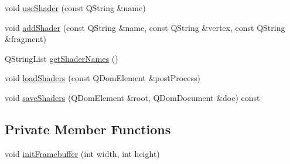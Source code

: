 \begin{DoxyCompactItemize}
void \hyperlink{class_my_open_g_l_widget_a87b9f933f545bf6f257820395771cc8b}{use\+Shader} (const Q\+String \&name)
\item 
void \hyperlink{class_my_open_g_l_widget_a1426e6f24592838e16c22a92870cf5f4}{add\+Shader} (const Q\+String \&name, const Q\+String \&vertex, const Q\+String \&fragment)
\item 
Q\+String\+List \hyperlink{class_my_open_g_l_widget_a99929e3c743d4f5793ef0e09ab61f2b2}{get\+Shader\+Names} ()
\item 
void \hyperlink{class_my_open_g_l_widget_af7899fd91898c1ed5dc228d7d6de658e}{load\+Shaders} (const Q\+Dom\+Element \&post\+Process)
\item 
void \hyperlink{class_my_open_g_l_widget_a177cfabda79d05c834b4f1a3f370a620}{save\+Shaders} (Q\+Dom\+Element \&root, Q\+Dom\+Document \&doc) const 
\end{DoxyCompactItemize}
\subsection*{Private Member Functions}
\begin{DoxyCompactItemize}
\item 
void \hyperlink{class_my_open_g_l_widget_ae2bcca23e0802d6f5ebf2ee3e6ed6e7a}{init\+Framebuffer} (int width, int height)
\end{DoxyCompactItemize}
